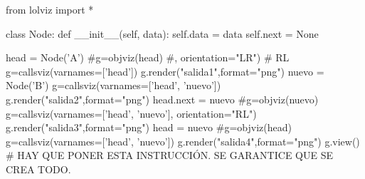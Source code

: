 \documentclass[10pt, envcountsect, spanish]{beamer}
\begin{document}
\begin{pycode}
from lolviz import *

class Node:
    def __init__(self, data):
        self.data = data
        self.next = None

head = Node('A')
#g=objviz(head) #, orientation="LR")  # RL
g=callsviz(varnames=['head'])
g.render("salida1",format="png")
nuevo = Node('B')
g=callsviz(varnames=['head', 'nuevo'])
g.render("salida2",format="png")
head.next = nuevo
#g=objviz(nuevo)
g=callsviz(varnames=['head', 'nuevo'], orientation="RL")
g.render("salida3",format="png")
head = nuevo
#g=objviz(head)
g=callsviz(varnames=['head', 'nuevo'])
g.render("salida4",format="png")
g.view()  # HAY QUE PONER ESTA INSTRUCCIÓN. SE GARANTICE QUE SE CREA TODO.
\end{pycode}
\end{document}
